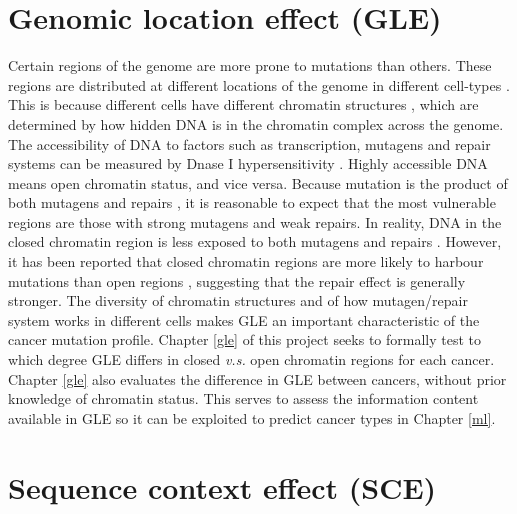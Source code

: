 \section{Genomic location effect (GLE)}
\label{intro:gle}
Certain regions of the genome are more prone to mutations than others. These regions are distributed at different locations of the genome in different cell-types \citep{Polak2015}. This is because different cells have different chromatin structures \citep{Abascal2020ExpandedGenomes}, which are determined by how hidden DNA is in the chromatin complex across the genome. The accessibility of DNA to factors such as transcription, mutagens and repair systems can be measured by Dnase I hypersensitivity \citep[DHS;][]{Liu2019AApplications}. Highly accessible DNA means open chromatin status, and vice versa. Because mutation is the product of both \glspl{mutagen} and repairs \citep{Ripley2001Mutation}, it is reasonable to expect that the most vulnerable regions are those with strong mutagens and weak repairs. In reality, DNA in the closed chromatin region is less exposed to both mutagens and repairs \citep[Figure \ref{fig:chromatin_demo};][]{Teng1997ExcisionSequences, Morse2002PhotoreactivationCerevisiae}. However, it has been reported that closed chromatin regions are more likely to harbour mutations than open regions \citep{Polak2015,Prendergast2007ChromatinGenome}, suggesting that the repair effect is generally stronger. The diversity of chromatin structures and of how mutagen/repair system works in different cells makes GLE an important characteristic of the cancer mutation profile. Chapter \ref{gle} of this project seeks to formally test to which degree GLE differs in closed \textit{v.s.} open chromatin regions for each cancer. Chapter \ref{gle} also evaluates the difference in GLE between cancers, without prior knowledge of chromatin status. This serves to assess the information content available in GLE so it can be exploited to predict cancer types in Chapter \ref{ml}.



\section{Sequence context effect (SCE)}
\label{intro:sce}

